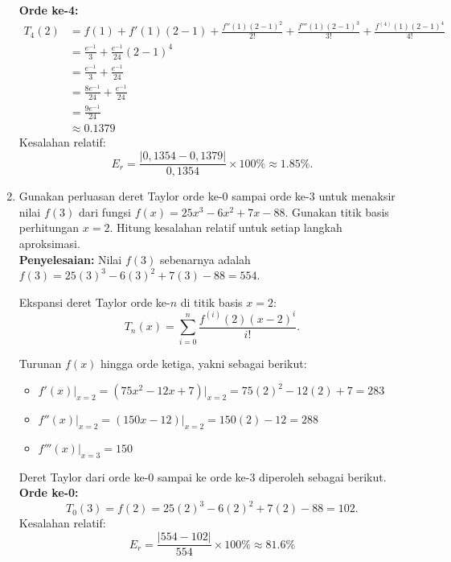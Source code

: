 \documentclass{article}
\newcommand{\penyelesaian}{\textbf{Penyelesaian: }}
\begin{document}
\begin{enumerate}
    \textbf{Orde ke-4:} 
    \begin{align*}
        T_4(2) 
        &= f(1) + f'(1)(2-1) + \frac{f''(1)(2-1)^2}{2!} + \frac{f'''(1)(2-1)^3}{3!} + \frac{f^{(4)}(1)(2-1)^4}{4!}\\
        &= \frac{e^{-1}}{3} + \frac{e^{-1}}{24}(2-1)^4 \\
        &= \frac{e^{-1}}{3} + \frac{e^{-1}}{24} \\
        &= \frac{8e^{-1}}{24} + \frac{e^{-1}}{24} \\
        &= \frac{9e^{-1}}{24} \\
        &\approx \num{0,1379}
    \end{align*}
    Kesalahan relatif:
    \begin{equation*}
        E_r = \frac{\left|0,1354 - 0,1379\right|}{0,1354} \times 100\% \approx \num{1,85}\%.
    \end{equation*}

    \item Gunakan perluasan deret Taylor orde ke-0 sampai orde ke-3 untuk menaksir nilai $f(3)$ dari fungsi $f(x) = 25x^3 - 6x^2 + 7x - 88$.  
    Gunakan titik basis perhitungan $x = 2$. Hitung kesalahan relatif untuk setiap langkah aproksimasi. \\
    \penyelesaian Nilai $f(3)$ sebenarnya adalah $f(3) = 25(3)^3 - 6(3)^2 + 7(3) - 88 = 554$.

    Ekspansi deret Taylor orde ke-$n$ di titik basis $x = 2$:
    \begin{equation*}
        T_n(x) = \sum_{i=0}^{n}\frac{f^{(i)}(2)(x-2)^i}{i!}.
    \end{equation*}

    Turunan $f(x)$ hingga orde ketiga, yakni sebagai berikut:
    \begin{itemize}
        \item $f'(x)\big|_{x=2} = (75x^2 - 12x + 7)\big|_{x=2} = 75(2)^2 - 12(2) + 7 = 283$ 
        \item $f''(x)\big|_{x=2} = (150x - 12)\big|_{x=2} = 150(2) - 12 = 288$
        \item $f'''(x)\big|_{x=3} = 150$
    \end{itemize}

    Deret Taylor dari orde ke-0 sampai ke orde ke-3 diperoleh sebagai berikut. \\

    \textbf{Orde ke-0:} 
    \begin{equation*}
        T_0(3) = f(2) = 25(2)^3 - 6(2)^2 + 7(2) - 88 = 102.
    \end{equation*}
    Kesalahan relatif: 
    \begin{equation*}
        E_r = \frac{\left|554 - 102\right|}{554} \times 100\% \approx \num{81,6}\%
    \end{equation*}


\end{enumerate}
\end{document}
